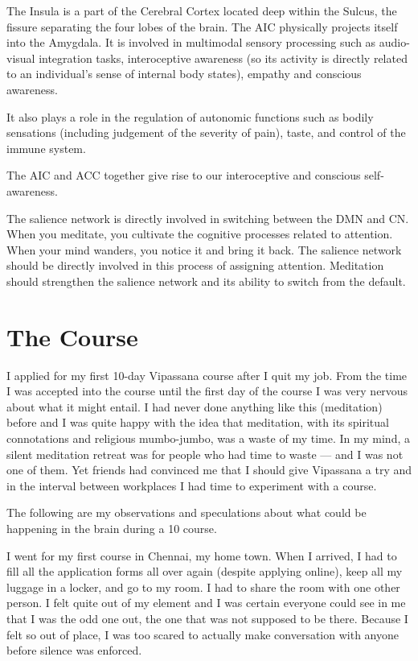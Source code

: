 \documentclass[a4paper, amsfonts, amssymb, amsmath, reprint, showkeys, nofootinbib, twoside]{revtex4-1}
\begin{document}
The Insula is a part of the Cerebral Cortex located deep within the Sulcus, the
fissure separating the four lobes of the brain. The AIC physically projects itself
into the Amygdala. It is involved in multimodal sensory processing such as
audio-visual integration tasks, interoceptive awareness (so its activity is directly
related to an individual's sense of internal body states), empathy and conscious
awareness. \cite{aicemotion}

It also plays a role in the regulation of autonomic functions such as bodily
sensations (including judgement of the severity of pain), taste, and control of the
immune system. \cite{aicautonomic}

The AIC and ACC together give rise to our interoceptive and conscious
self-awareness.  \cite{selfaware}

The salience network is directly involved in switching between the DMN and CN. 
When you meditate, you cultivate the cognitive processes related to attention.
When your mind wanders, you notice it and bring it back. 
The salience network should be directly involved in this process of assigning attention. 
Meditation should strengthen the salience network and its ability to switch from
the default. 


\section{The Course}

I applied for my first 10-day Vipassana course after I quit my job. From the time I
was accepted into the course until the first day of the course I was very nervous
about what it might entail. I had never done anything like this (meditation) before
and I was quite happy with the idea that meditation, with its spiritual connotations
and religious mumbo-jumbo, was a waste of my time. In my mind, a silent meditation retreat was
for people who had time to waste --- and I was not one of them. Yet friends had convinced me that I
should give Vipassana a try and in the interval between workplaces I had
time to experiment with a course.

The following are my observations and speculations about what could be happening 
in the brain during a 10 course. 

I went for my first course in Chennai, my home town. When I arrived, I had to fill
all the application forms all over again (despite applying online), keep all my
luggage in a locker, and go to my room. I had to share the room with one other
person. I felt quite out of my element and I was certain everyone could see in me
that I was the odd one out, the one that was not supposed to be there. Because I felt
so out of place, I was too scared to actually make conversation with anyone before
silence was enforced.
\end{document}

